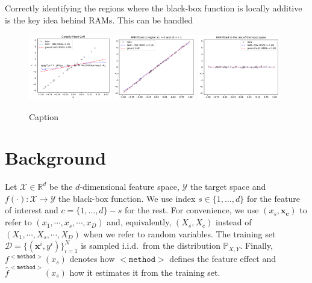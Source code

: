 \documentclass[12pt]{article}
\newcommand{\Rd}{\mathbb{R}^d}
\newcommand{\xb}{\mathbf{x}}
\newcommand{\xc}{\mathbf{x_c}}
\newcommand{\Xcal}{\mathcal{X}}
\newcommand{\Ycal}{\mathcal{Y}}
\begin{document}
Correctly identifying the regions where the black-box function is locally additive is the key idea behind RAMs.
This can be handled


\begin{figure}[htbp]
    \centering
    \includegraphics[width=0.32\textwidth]{figures/global_GAM.pdf}
    \includegraphics[width=0.32\textwidth]{figures/regional_gam_subreg_1.pdf}
    \includegraphics[width=0.32\textwidth]{figures/regional_gam_subreg_2.pdf}
    \caption{Caption}
\end{figure}

\section{Background}

Let \(\Xcal \in \Rd\) be the \(d\)-dimensional feature space, \(\Ycal\) the target space and \(f(\cdot) : \Xcal \rightarrow \Ycal\) the black-box function.  We use index \(s \in \{1, \ldots, d\}\) for the feature of interest and \(c = \{1, \ldots, d\} - s\) for the rest.
For convenience, we use \((x_s, \xc)\) to refer to \((x_1, \cdots , x_s, \cdots, x_D)\) and, equivalently, \((X_s, X_c)\) instead of \((X_1, \cdots , X_s, \cdots, X_D)\) when we refer to random variables.
The training set \(\mathcal{D} = \{(\xb^i, y^i)\}_{i=1}^N\) is sampled
i.i.d.\ from the distribution \(\mathbb{P}_{X,Y}\).  Finally,
\(f^{\mathtt{<method>}}(x_s)\) denotes how \(\mathtt{<method>}\)
defines the feature effect and \(\hat{f}^{\mathtt{<method>}}(x_s)\)
how it estimates it from the training set.
\end{document}
